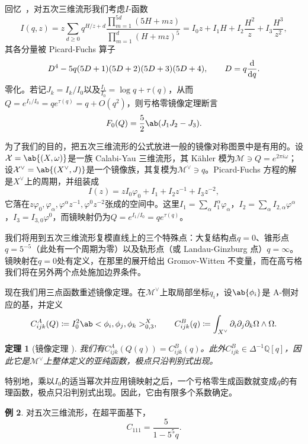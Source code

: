 \documentclass{amsart}
\newtheorem{thm}{定理}[section]
\theoremstyle{definition}
\newtheorem{exm}[thm]{例}
\theoremstyle{remark}
\theoremstyle{plain}
\theoremstyle{definition}
\theoremstyle{remark}
\newcommand{\Q}{\mathbb{Q}}
\newcommand{\mc}[1]{\mathcal{#1}}
\newcommand{\1}{\mathbf{1}}
\newcommand{\2}{\mathbf{2}}
\newcommand{\3}{\mathbf{3}}
\begin{document}
回忆~，对五次三维流形我们考虑\(I\)-函数
\[
    I(q,z) = z\sum_{d \geq 0} q^{H/z+d} \frac{\prod_{m=1}^{5d}(5H+mz)}{\prod_{m=1}^d (H+mz)^5} = I_0 z + I_1 H + I_2 \frac{H^2}{z} + I_3 \frac{H^3}{z^2},
\]
其各分量被 Picard-Fuchs 算子
\[ D^4 - 5q(5D+1)(5D+2)(5D+3)(5D+4), \qquad D = q \odv{}{q}. \]
零化。若记\(J_k = I_k/I_0\)以及\(\frac{I_1}{I_0} = \log q + \tau(q)\)，从而\(Q = e^{I_1/I_0} = qe^{\tau(q)} = q + O(q^2)\)，则亏格零镜像定理断言
\[ F_0(Q) = \frac{5}{2}\ab(J_1 J_2 - J_3). \]

为了我们的目的，把五次三维流形的公式放进一般的镜像对称图景中是有用的。设\(\mc{X} = \ab\{(X,\omega)\}\)是一族 Calabi-Yau 三维流形，其 Kähler 模为\(\mc{M} \ni Q = e^{2\pi i \omega}\)；设\(\mc{X}^{\vee} = \ab\{(X^{\vee},J)\}\)是一个镜像族，其复模为\(\mc{M}^{\vee} \ni q\)。Picard-Fuchs 方程的解是\(X^{\vee}\)上的周期，并组装成
\[ I(z) = zI_0\varphi_0 + I_1 + I_2 z^{-1} + I_3 z^{-2}, \]
它落在\(z\varphi_0, \varphi_{\alpha}, \varphi^{\alpha}z^{-1}, \varphi^0 z^{-2}\)张成的空间中。这里\(I_1 = \sum_{\alpha} I_1^{\alpha}\varphi_{\alpha}\)，\(I_2 = \sum_{\alpha} I_{2,\alpha}\varphi^{\alpha}\)，\(I_3 = I_{3,0}\varphi^0\)，而镜映射仍为\(Q = e^{I_1/I_0} = qe^{\tau(q)}\)。

我们将用到五次三维流形复模直线上的三个特殊点：大复结构点\(q=0\)、锥形点\(q = 5^{-5}\)（此处有一个周期为零）以及轨形点（或 Landau-Ginzburg 点）\(q = \infty\)。镜映射在\(q=0\)处有定义，在那里的展开给出 Gromov-Witten 不变量，而在高亏格我们将在另外两个点处施加边界条件。

现在我们用三点函数重述镜像定理。在\(\mc{M}^{\vee}\)上取局部坐标\(q_i\)，设\(\ab\{\phi_i\}\)是 A-侧对应的基，并定义
\[ C^A_{ijk}(Q) \coloneqq I_0^2 \ab<\phi_i, \phi_j, \phi_k>^X_{0,3}, \qquad C^B_{ijk}(q) \coloneqq \int_{X^{\vee}} \partial_i \partial_j \partial_k \Omega \wedge \Omega. \]

\begin{thm}[镜像定理 {\cite{Givental1998,LLY1997}}]
    我们有\(C^A_{ijk}(Q(q)) = C^B_{ijk}(q)\)。此外\(C^B_{ijk} \in \Delta^{-1}\Q[q]\)，因此它是\(\mc{M}^{\vee}\)上整体定义的亚纯函数，极点只沿判别式出现。
\end{thm}

特别地，乘以\(I_0\)的适当幂次并应用镜映射之后，一个亏格零生成函数就变成\(q\)的有理函数，极点只沿判别式出现。因此，它由有限多个系数确定。

\begin{exm}
    对五次三维流形，在超平面基下，
    \[ C_{111} = \frac{5}{1-5^5 q}. \]
\end{exm}
\end{document}
